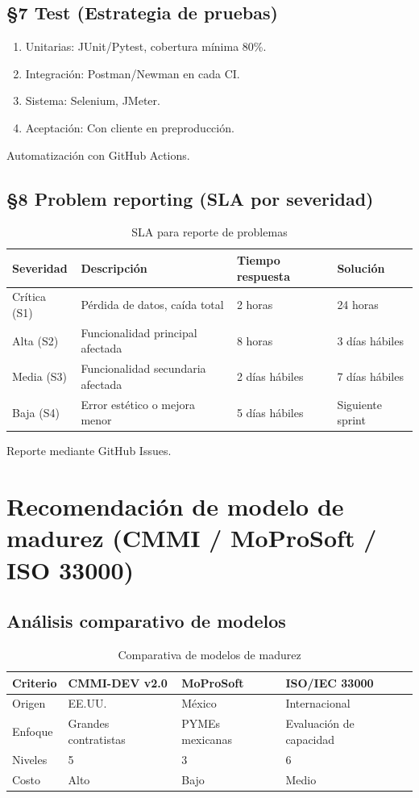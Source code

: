 \documentclass[12pt]{article}
\begin{document}
\subsection{§7 Test (Estrategia de pruebas)}
\begin{enumerate}
    \item Unitarias: JUnit/Pytest, cobertura mínima 80\%.
    \item Integración: Postman/Newman en cada CI.
    \item Sistema: Selenium, JMeter.
    \item Aceptación: Con cliente en preproducción.
\end{enumerate}
Automatización con GitHub Actions.

\subsection{§8 Problem reporting (SLA por severidad)}
\begin{table}[H]
\centering
\caption{SLA para reporte de problemas}
\begin{tabular}{|l|l|l|l|}
\hline
\textbf{Severidad} & \textbf{Descripción} & \textbf{Tiempo respuesta} & \textbf{Solución} \\ \hline
Crítica (S1) & Pérdida de datos, caída total & 2 horas & 24 horas \\ \hline
Alta (S2) & Funcionalidad principal afectada & 8 horas & 3 días hábiles \\ \hline
Media (S3) & Funcionalidad secundaria afectada & 2 días hábiles & 7 días hábiles \\ \hline
Baja (S4) & Error estético o mejora menor & 5 días hábiles & Siguiente sprint \\ \hline
\end{tabular}
\end{table}
Reporte mediante GitHub Issues.

\section{Recomendación de modelo de madurez (CMMI / MoProSoft / ISO 33000)}

\subsection{Análisis comparativo de modelos}
\begin{table}[H]
\centering
\small
\begin{tabularx}{\textwidth}{|l|X|X|X|}
\hline
\textbf{Criterio} & \textbf{CMMI-DEV v2.0} & \textbf{MoProSoft} & \textbf{ISO/IEC 33000} \\ \hline
Origen & EE.UU. & México & Internacional \\ \hline
Enfoque & Grandes contratistas & PYMEs mexicanas & Evaluación de capacidad \\ \hline
Niveles & 5 & 3 & 6 \\ \hline
Costo & Alto & Bajo & Medio \\ \hline
\end{tabularx}
\caption{Comparativa de modelos de madurez}
\end{table}
\end{document}

